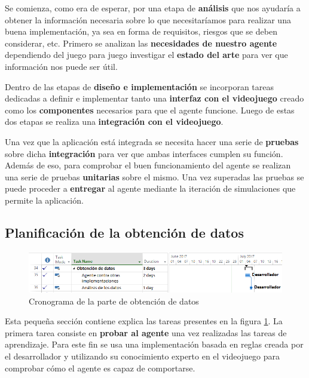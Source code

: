 \bigskip

Se comienza, como era de esperar, por una etapa de \textbf{análisis} que nos ayudaría a obtener la información necesaria sobre lo que necesitaríamos para realizar una buena implementación, ya sea en forma de requisitos, riesgos que se deben considerar, etc. Primero se analizan las \textbf{necesidades de nuestro agente} dependiendo del juego para juego investigar el \textbf{estado del arte} para ver que información nos puede ser útil.

\bigskip

Dentro de las etapas de \textbf{diseño e implementación} se incorporan tareas dedicadas a definir e implementar tanto una \textbf{interfaz con el videojuego} creado como los \textbf{componentes} necesarios para que el agente funcione. Luego de estas dos etapas se realiza una \textbf{integración con el videojuego}.

\bigskip

Una vez que la aplicación está integrada se necesita hacer una serie de \textbf{pruebas} sobre dicha \textbf{integración} para ver que ambas interfaces cumplen su función. Además de eso, para comprobar el buen funcionamiento del agente se realizan una serie de pruebas \textbf{unitarias} sobre el mismo. Una vez superadas las pruebas se puede proceder a \textbf{entregar} al agente mediante la iteración de simulaciones que permite la aplicación.


\subsection{Planificación de la obtención de datos}

\begin{figure}
	\centerline{\includegraphics[width=17cm]{otros/capturasPlanificacion/obtencion_de_datos.PNG}}
	\caption{Cronograma de la parte de obtención de datos}
	\label{plan:datos}
\end{figure}


Esta pequeña sección contiene explica las tareas presentes en la figura \ref{plan:datos}. La primera tarea consiste en \textbf{probar al agente} una vez realizadas las tareas de aprendizaje. Para este fin se usa una implementación basada en reglas creada por el desarrollador y utilizando su conocimiento experto en el videojuego para comprobar cómo el agente es capaz de comportarse.

